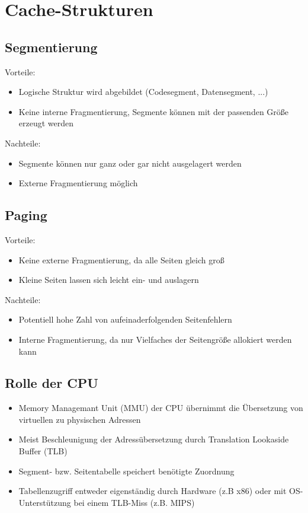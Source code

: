 \documentclass{kit}
\begin{document}
\section{Cache-Strukturen}
  \subsection{Segmentierung}
    Vorteile:
    \begin{itemize}
      \item Logische Struktur wird abgebildet (Codesegment, Datensegment, ...)
      \item Keine interne Fragmentierung, Segmente können mit der passenden Größe erzeugt werden
    \end{itemize}
    Nachteile:
    \begin{itemize}
      \item Segmente können nur ganz oder gar nicht ausgelagert werden
      \item Externe Fragmentierung möglich
    \end{itemize}
  \subsection{Paging}
    Vorteile:
    \begin{itemize}
      \item Keine externe Fragmentierung, da alle Seiten gleich groß
      \item Kleine Seiten lassen sich leicht ein- und auslagern
    \end{itemize}
    Nachteile:
    \begin{itemize}
      \item Potentiell hohe Zahl von aufeinaderfolgenden Seitenfehlern
      \item Interne Fragmentierung, da nur Vielfaches der Seitengröße allokiert werden kann
    \end{itemize}
  \subsection{Rolle der CPU}
    \begin{itemize}
      \item Memory Managemant Unit (MMU) der CPU übernimmt die Übersetzung von virtuellen zu physischen
        Adressen
      \item Meist Beschleunigung der Adressübersetzung durch Translation Lookaside Buffer (TLB)
      \item Segment- bzw. Seitentabelle speichert benötigte Zuordnung
      \item Tabellenzugriff entweder eigenständig durch Hardware (z.B x86) oder mit OS-Unterstützung
        bei einem TLB-Miss (z.B. MIPS)
    \end{itemize}
\end{document}

